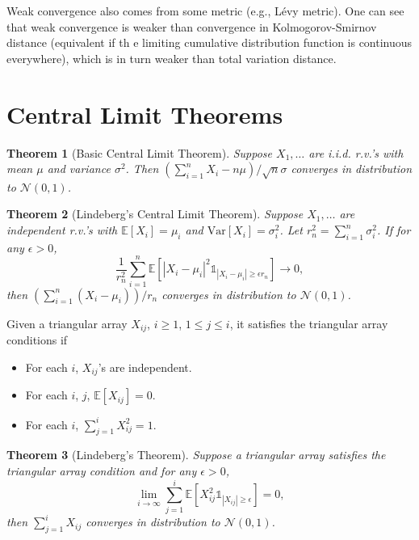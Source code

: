 \documentclass[openany]{book}
\newtheorem{theorem}{Theorem}[chapter]
\theoremstyle{definition}
\theoremstyle{remark}
\begin{document}
Weak convergence also comes from some metric (e.g., L\'{e}vy metric). One can see that weak convergence is weaker than convergence in Kolmogorov-Smirnov distance (equivalent if th e limiting cumulative distribution function is continuous everywhere), which is in turn weaker than total variation distance.

\section{Central Limit Theorems}
\begin{theorem}[Basic Central Limit Theorem]
    Suppose $X_1,\ldots$ are i.i.d. r.v.'s with mean $\mu$ and variance $\sigma^2$. Then $\left(\sum_{i=1}^{n}X_i-n\mu\right)/\sqrt{n}\sigma$ converges in distribution to $\mathcal{N}(0,1)$.
\end{theorem}
\begin{theorem}[Lindeberg's Central Limit Theorem]
    Suppose $X_1,\ldots$ are independent r.v.'s with $\mathbb{E}[X_i]=\mu_i$ and $\mathrm{Var}[X_i]=\sigma_i^2$. Let $r_n^2=\sum_{i=1}^{n}\sigma_i^2$. If for any $\epsilon>0$,
    \begin{equation*}
        \frac{1}{r_n^2}\sum_{i=1}^{n}\mathbb{E}\left[|X_i-\mu_i|^2\mathds{1}_{|X_i-\mu_i|\ge\epsilon r_n}\right]\to0,
    \end{equation*}
    then $\left(\sum_{i=1}^{n}(X_i-\mu_i)\right)/r_n$ converges in distribution to $\mathcal{N}(0,1)$.
\end{theorem}
Given a triangular array $X_{ij}$, $i\ge1$, $1\le j\le i$, it satisfies the triangular array conditions if
\begin{itemize}
    \item For each $i$, $X_{ij}$'s are independent.
    \item For each $i$, $j$, $\mathbb{E}[X_{ij}]=0$.
    \item For each $i$, $\sum_{j=1}^{i}X_{ij}^2=1$.
\end{itemize}
\begin{theorem}[Lindeberg's Theorem]
    Suppose a triangular array satisfies the triangular array condition and for any $\epsilon>0$,
    \begin{equation*}
        \lim_{i\to\infty}\sum_{j=1}^{i}\mathbb{E}\left[X_{ij}^2\mathds{1}_{|X_{ij}|\ge\epsilon}\right]=0,
    \end{equation*}
    then $\sum_{j=1}^{i}X_{ij}$ converges in distribution to $\mathcal{N}(0,1)$.
\end{theorem}
\end{document}
